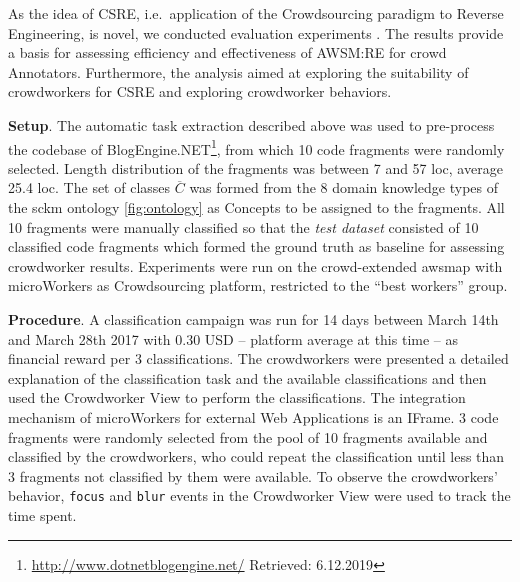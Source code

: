 As the idea of CSRE, i.e.~application of the \gls{Crowdsourcing} paradigm to \gls{Reverse Engineering}, is novel, we conducted evaluation experiments \autocite{Heil2019CSRECCIS}.
The results provide a basis for assessing efficiency and effectiveness of AWSM:RE for crowd Annotators.
Furthermore, the analysis aimed at exploring the suitability of crowdworkers for CSRE and exploring crowdworker behaviors.

\textbf{Setup}. The automatic task extraction described above was used to pre-process the codebase of BlogEngine.NET\footnote{\url{http://www.dotnetblogengine.net/} Retrieved: 6.12.2019}, from which 10 code fragments were randomly selected.
Length distribution of the fragments was between 7 and 57 \gls{loc}, average 25.4 \gls{loc}.
The set of classes \(\overline C\) was formed from the 8 domain knowledge types of the \gls{sckm} ontology \cref{fig:ontology} as \glspl{Concept} to be assigned to the fragments.
All 10 fragments were manually classified so that the \emph{test dataset} consisted of 10 classified code fragments which formed the ground truth as baseline for assessing crowdworker results.
Experiments were run on the crowd-extended \gls{awsmap} with microWorkers as \gls{Crowdsourcing} platform, restricted to the ``best workers'' group.

\textbf{Procedure}. A classification campaign was run for 14 days between March 14th and March 28th 2017 with 0.30 USD -- platform average at this time -- as financial reward per 3 classifications.
The crowdworkers were presented a detailed explanation of the classification task and the available classifications and then used the Crowdworker View to perform the classifications.
The integration mechanism of microWorkers for external \glspl{Web Application} is an IFrame.
3 code fragments were randomly selected from the pool of 10 fragments available and classified by the crowdworkers, who could repeat the classification until less than 3 fragments not classified by them were available.
To observe the crowdworkers' behavior, \texttt{focus} and \texttt{blur} events in the Crowdworker View were used to track the time spent.


